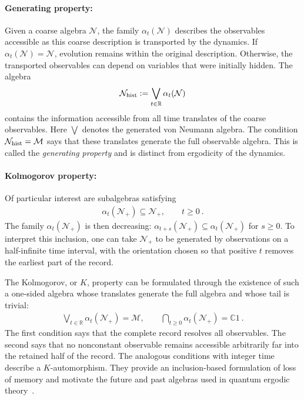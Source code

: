 \documentclass[a4paper,11pt]{article}
\theoremstyle{definition}
\newcommand{\mN}{\mathcal{N}}
\newcommand{\mM}{\mathcal{M}}
\begin{document}
\paragraph{Generating property:}
Given a coarse algebra $\mN$, the family $\alpha_t(\mN)$ describes the observables accessible as this coarse description is transported by the dynamics. If $\alpha_t(\mN)=\mN$, evolution remains within the original description. Otherwise, the transported observables can depend on variables that were initially hidden. The algebra
\begin{align}
    \mN_{\rm hist}:=\bigvee_{t\in\mathbb R}\alpha_t(\mN)
\end{align}
contains the information accessible from all time translates of the coarse observables. Here $\bigvee$ denotes the generated von Neumann algebra. The condition $\mN_{\rm hist}=\mM$ says that these translates generate the full observable algebra. This is called the {\it generating property} and is distinct from ergodicity of the dynamics.

\paragraph{Kolmogorov property:}
Of particular interest are subalgebras satisfying
\begin{align}\label{eq:classical-one-sided-inclusion}
    \alpha_t(\mN_+)\subseteq\mN_+,\qquad t\geq0\ .
\end{align}
The family $\alpha_t(\mN_+)$ is then decreasing: $\alpha_{t+s}(\mN_+)\subseteq\alpha_t(\mN_+)$ for $s\geq0$. To interpret this inclusion, one can take $\mN_+$ to be generated by observations on a half-infinite time interval, with the orientation chosen so that positive $t$ removes the earliest part of the record.

The Kolmogorov, or $K$, property can be formulated through the existence of such a one-sided algebra whose translates generate the full algebra and whose tail is trivial:
\begin{align}\label{eq:classical-K-algebra}
    \bigvee_{t\in\mathbb R}\alpha_t(\mN_+)=\mM,
    \qquad
    \bigcap_{t\geq0}\alpha_t(\mN_+)=\mathbb C1\ .
\end{align}
The first condition says that the complete record resolves all observables. The second says that no nonconstant observable remains accessible arbitrarily far into the retained half of the record. The analogous conditions with integer time describe a $K$-automorphism. They provide an inclusion-based formulation of loss of memory and motivate the future and past algebras used in quantum ergodic theory~\cite{ouseph2024local}.
\end{document}
